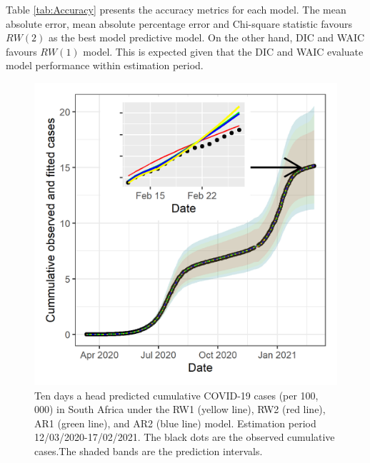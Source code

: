 \documentclass[10pt,letterpaper]{article}
\begin{document}
Table \ref{tab:Accuracy} presents the accuracy metrics for each model. The mean absolute error, mean absolute percentage error and Chi-square statistic favours \(RW(2)\) as the best model predictive model. On the other hand, DIC and WAIC favours \(RW(1)\) model. This is expected given that the DIC and WAIC evaluate model performance within estimation period. 

\begin{figure}[!h]
\includegraphics[width=0.99\linewidth]{forcast_cum_all.png} \caption{Ten days a head predicted cumulative COVID-19 cases (per 100, 000) in South Africa under the RW1 (yellow line), RW2 (red line), AR1 (green line), and AR2 (blue line) model. Estimation period 12/03/2020-17/02/2021. The black dots are the observed cumulative cases.The shaded bands are the prediction intervals. }\label{fig:10daypred}
\end{figure}
\end{document}
